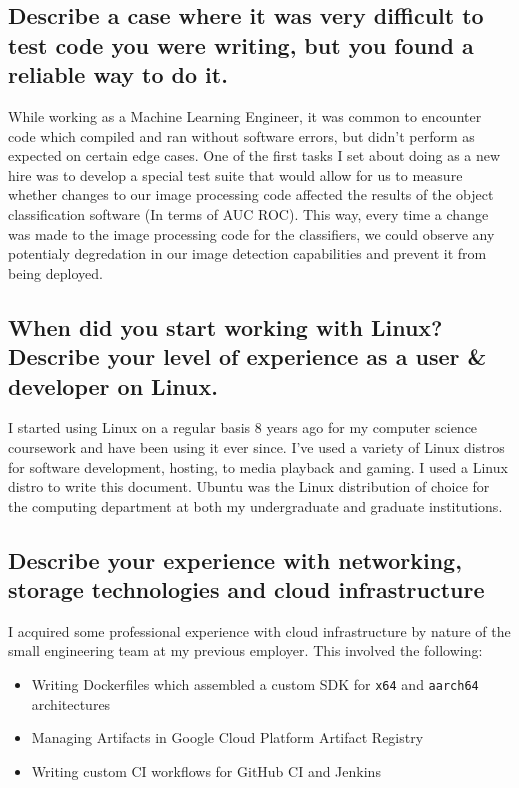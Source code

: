 \documentclass{article}
\begin{document}
\subsection{Describe a case where it was very difficult to test code you were
    writing, but you found a reliable way to do it.}

While working as a Machine Learning Engineer, it was common to encounter
code which compiled and ran without software errors, but didn't perform as
expected on certain edge cases. One of the first tasks I set about doing as a
new hire was to develop a special test suite that would allow for us to measure
whether changes to our image processing code affected the results of the object
classification software (In terms of AUC ROC\cite{auc_roc}). This way, every
time a change was made to the image processing code for the classifiers, we could
observe any potentialy degredation in our image detection capabilities and prevent
it from being deployed.

\subsection{When did you start working with Linux? Describe your level of
    experience as a user \& developer on Linux.}

I started using Linux on a regular basis 8 years ago for my computer science
coursework and have been using it ever since. I've used a variety of Linux
distros for software development, hosting, to media playback and gaming. I
used a Linux distro to write this document. Ubuntu was the Linux distribution of
choice for the computing department at both my undergraduate and graduate institutions.

\subsection{Describe your experience with networking, storage technologies and
    cloud infrastructure}

I acquired some professional experience with cloud infrastructure by nature of the
small engineering team at my previous employer. This involved the following:
\begin{itemize}
    \item Writing Dockerfiles which assembled a custom SDK for \texttt{x64} and
          \texttt{aarch64} architectures
    \item Managing Artifacts in Google Cloud Platform Artifact Registry
    \item Writing custom CI workflows for GitHub CI and Jenkins
\end{itemize}
\end{document}
